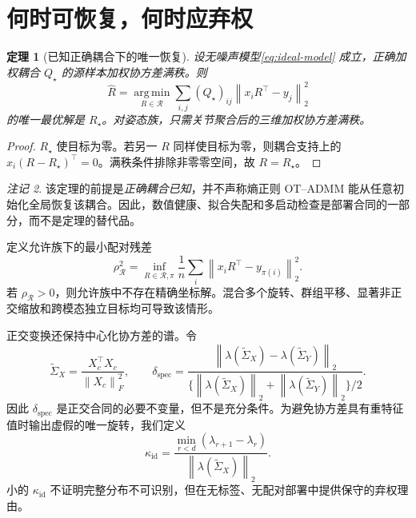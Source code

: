 \documentclass[UTF8,a4paper,11pt]{ctexart}
\newcommand{\norm}[1]{\left\lVert #1\right\rVert}
\newcommand{\argmin}{\operatorname*{arg\,min}}
\newtheorem{theorem}{定理}
\theoremstyle{definition}
\theoremstyle{remark}
\newtheorem{remark}[theorem]{注记}
\begin{document}
\section{何时可恢复，何时应弃权}\label{sec:theory}
\begin{theorem}[已知正确耦合下的唯一恢复]\label{thm:recovery}
设无噪声模型\cref{eq:ideal-model} 成立，正确加权耦合 $Q_\star$ 的源样本加权协方差满秩。则
\begin{equation}
 \widehat R=\argmin_{R\in\mathcal R}
 \sum_{i,j}(Q_\star)_{ij}\norm{x_iR^\top-y_j}_2^2
\end{equation}
的唯一最优解是 $R_\star$。对姿态族，只需关节聚合后的三维加权协方差满秩。
\end{theorem}
\begin{proof}
$R_\star$ 使目标为零。若另一 $R$ 同样使目标为零，则耦合支持上的 $x_i(R-R_\star)^\top=0$。满秩条件排除非零零空间，故 $R=R_\star$。
\end{proof}

\begin{remark}
该定理的前提是\emph{正确耦合已知}，并不声称熵正则 OT--ADMM 能从任意初始化全局恢复该耦合。因此，数值健康、拟合失配和多启动检查是部署合同的一部分，而不是定理的替代品。
\end{remark}

定义允许族下的最小配对残差
\begin{equation}
 \rho_{\mathcal R}^2=\inf_{R\in\mathcal R,\pi}\frac1n\sum_i\norm{x_iR^\top-y_{\pi(i)}}_2^2.
\end{equation}
若 $\rho_{\mathcal R}>0$，则允许族中不存在精确坐标解。混合多个旋转、群组平移、显著非正交缩放和跨模态独立目标均可导致该情形。

正交变换还保持中心化协方差的谱。令
\begin{equation}
 \widetilde\Sigma_X=\frac{X_c^\top X_c}{\norm{X_c}_F^2},\qquad
 \delta_{\mathrm{spec}}=
 \frac{\norm{\lambda(\widetilde\Sigma_X)-\lambda(\widetilde\Sigma_Y)}_2}
 {\{\norm{\lambda(\widetilde\Sigma_X)}_2+\norm{\lambda(\widetilde\Sigma_Y)}_2\}/2}.
\end{equation}
因此 $\delta_{\mathrm{spec}}$ 是正交合同的必要不变量，但不是充分条件。为避免协方差具有重特征值时输出虚假的唯一旋转，我们定义
\begin{equation}
 \kappa_{\mathrm{id}}=\frac{\min_{r<d}(\lambda_{r+1}-\lambda_r)}{\norm{\lambda(\widetilde\Sigma_X)}_2}.
\end{equation}
小的 $\kappa_{\mathrm{id}}$ 不证明完整分布不可识别，但在无标签、无配对部署中提供保守的弃权理由。
\end{document}
